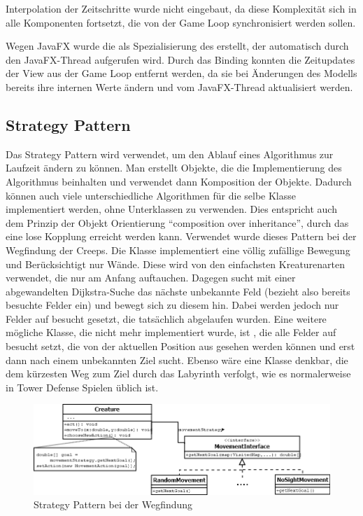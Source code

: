 Interpolation der Zeitschritte wurde nicht eingebaut, da diese Komplexität sich in alle Komponenten fortsetzt, die von der Game Loop synchronisiert werden sollen.

Wegen JavaFX wurde die  als Spezialisierung des  erstellt, der automatisch durch den JavaFX-Thread aufgerufen wird. Durch das Binding konnten die Zeitupdates der View aus der Game Loop entfernt werden, da sie bei Änderungen des Modells bereits ihre internen Werte ändern und vom JavaFX-Thread aktualisiert werden.

\subsection{Strategy Pattern} %
\label{sub:strategy_pattern}
Das Strategy Pattern wird verwendet, um den Ablauf eines Algorithmus zur Laufzeit ändern zu können. Man erstellt Objekte, die die Implementierung des Algorithmus beinhalten und verwendet dann Komposition der Objekte. Dadurch können auch viele unterschiedliche Algorithmen für die selbe Klasse implementiert werden, ohne Unterklassen zu verwenden. Dies entspricht auch dem Prinzip der Objekt Orientierung \enquote{composition over inheritance}, durch das eine lose Kopplung erreicht werden kann. Verwendet wurde dieses Pattern bei der Wegfindung der Creeps. Die Klasse  implementiert eine völlig zufällige Bewegung und Berücksichtigt nur Wände. Diese wird von den einfachsten Kreaturenarten verwendet, die nur am Anfang auftauchen. Dagegen sucht  mit einer abgewandelten Dijkstra-Suche das nächste unbekannte Feld (bezieht also bereits besuchte Felder ein) und bewegt sich zu diesem hin. Dabei werden jedoch nur Felder auf besucht gesetzt, die tatsächlich abgelaufen wurden. Eine weitere mögliche Klasse, die nicht mehr implementiert wurde, ist , die alle Felder auf besucht setzt, die von der aktuellen Position aus gesehen werden können und erst dann nach einem unbekannten Ziel sucht. Ebenso wäre eine Klasse  denkbar, die dem kürzesten Weg zum Ziel durch das Labyrinth verfolgt, wie es normalerweise in Tower Defense Spielen üblich ist.

\begin{figure}[htb]
	\centering
	\includegraphics[width=\linewidth]{images/strategy-pattern.png}
	\caption{Strategy Pattern bei der Wegfindung}
\end{figure}

